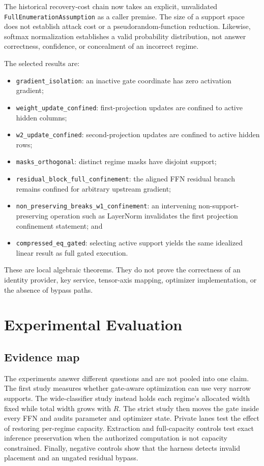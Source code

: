 \documentclass[11pt]{article}
\begin{document}
The historical recovery-cost chain now takes an explicit, unvalidated
\texttt{FullEnumerationAssumption} as a caller premise. The size of a support
space does not establish attack cost or a pseudorandom-function reduction.
Likewise, softmax normalization establishes a valid probability distribution,
not answer correctness, confidence, or concealment of an incorrect regime.

The selected results are:
\begin{itemize}
  \item \texttt{gradient\_isolation}: an inactive gate coordinate has zero
  activation gradient;
  \item \texttt{weight\_update\_confined}: first-projection updates are
  confined to active hidden columns;
  \item \texttt{w2\_update\_confined}: second-projection updates are confined
  to active hidden rows;
  \item \texttt{masks\_orthogonal}: distinct regime masks have disjoint
  support;
  \item \texttt{residual\_block\_full\_confinement}: the aligned FFN residual
  branch remains confined for arbitrary upstream gradient;
  \item \texttt{non\_preserving\_breaks\_w1\_confinement}: an intervening
  non-support-preserving operation such as LayerNorm invalidates the first
  projection confinement statement; and
  \item \texttt{compressed\_eq\_gated}: selecting active support yields the
  same idealized linear result as full gated execution.
\end{itemize}

These are local algebraic theorems. They do not prove the correctness of an
identity provider, key service, tensor-axis mapping, optimizer implementation,
or the absence of bypass paths.

\section{Experimental Evaluation}

\subsection{Evidence map}

The experiments answer different questions and are not pooled into one claim.
The first study measures whether gate-aware optimization can use very narrow
supports. The wide-classifier study instead holds each regime's allocated width
fixed while total width grows with $R$. The strict study then moves the gate
inside every FFN and audits
parameter and optimizer state. Private lanes test the effect of restoring
per-regime capacity. Extraction and full-capacity controls test exact inference
preservation when the authorized computation is not capacity constrained.
Finally, negative controls show that the harness detects invalid placement and
an ungated residual bypass.
\end{document}
